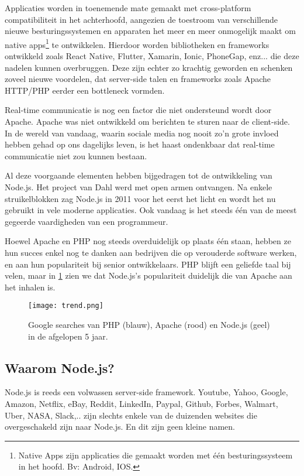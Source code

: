 Applicaties worden in toenemende mate gemaakt met cross-platform compatibiliteit in het achterhoofd, aangezien de toestroom van verschillende nieuwe besturingssystemen en apparaten het meer en meer onmogelijk maakt om native apps\footnote{Native Apps zijn applicaties die gemaakt worden met één besturingssysteem in het hoofd. Bv: Android, IOS.} te ontwikkelen. Hierdoor worden bibliotheken en frameworks ontwikkeld zoals React Native, Flutter, Xamarin, Ionic, PhoneGap, enz... die deze nadelen kunnen overbruggen. Deze zijn echter zo krachtig geworden en schenken zoveel nieuwe voordelen, dat server-side talen en frameworks zoals Apache HTTP/PHP eerder een bottleneck vormden. 

Real-time communicatie is nog een factor die niet ondersteund wordt door Apache. Apache was niet ontwikkeld om berichten te sturen naar de client-side. In de wereld van vandaag, waarin sociale media nog nooit zo'n grote invloed hebben gehad op ons dagelijks leven, is het haast ondenkbaar dat real-time communicatie niet zou kunnen bestaan. 

Al deze voorgaande elementen hebben bijgedragen tot de ontwikkeling van Node.js. Het project van Dahl werd met open armen ontvangen. Na enkele struikelblokken zag Node.js in 2011 voor het eerst het licht en wordt het nu gebruikt in vele moderne applicaties. Ook vandaag is het steeds één van de meest gegeerde vaardigheden van een programmeur. \autocite{Patel2018}

Hoewel Apache en PHP nog steeds overduidelijk op plaats één staan, hebben ze hun succes enkel nog te danken aan bedrijven die op verouderde software werken, en aan hun populariteit bij senior ontwikkelaars. PHP blijft een geliefde taal bij velen, maar in \ref{fig:trend} zien we dat Node.js's populariteit duidelijk die van Apache aan het inhalen is. \autocite{SimilarTech}

\begin{figure}[h]
	\texttt{[image: trend.png]}
	\caption{Google searches van PHP (blauw), Apache (rood) en Node.js (geel) in de afgelopen 5 jaar.}
	\label{fig:trend}
\end{figure}

\subsection{Waarom Node.js?}
\label{sec:whyNode}
Node.js is reeds een volwassen server-side framework. Youtube, Yahoo, Google, Amazon, Netflix, eBay, Reddit, LinkedIn, Paypal, Github, Forbes, Walmart, Uber, NASA, Slack,.. zijn slechts enkele van de duizenden websites die overgeschakeld zijn naar Node.js. En dit zijn geen kleine namen.

